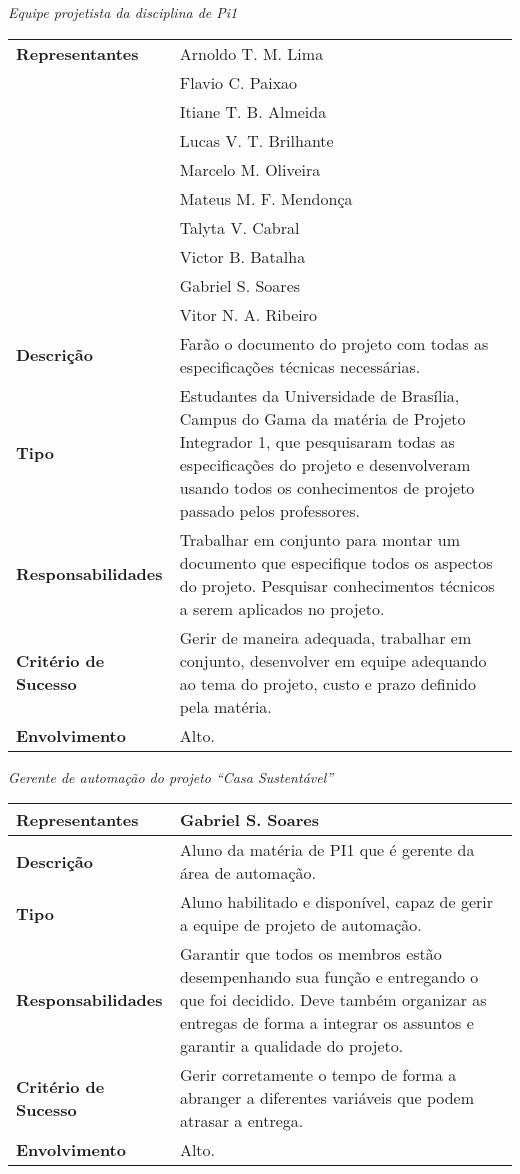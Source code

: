 \textit{Equipe projetista da disciplina de Pi1}

\begin{longtable}{|m{5cm}|m{10cm}|}
	\hline \textbf{Representantes} & Arnoldo T. M. Lima\\ & Flavio C. Paixao\\ & Itiane T. B. Almeida\\ & Lucas V. T.
	Brilhante\\ & Marcelo M. Oliveira\\ & Mateus M. F. Mendon\c{c}a\\ & Talyta V. Cabral\\ & Victor B. Batalha\\ &
	Gabriel S. Soares\\ & Vitor N. A. Ribeiro\\
	\hline \textbf{Descrição} & Farão o documento do projeto com todas as especificações técnicas necessárias.\\
	\hline \textbf{Tipo} & Estudantes da Universidade de Brasília, Campus do Gama da matéria de Projeto Integrador 1,
	que pesquisaram todas as especificações do projeto e desenvolveram usando todos os conhecimentos de projeto passado
	pelos professores.\\
	\hline \textbf{Responsabilidades} & Trabalhar em conjunto para montar um documento que especifique todos os aspectos
	 do projeto. Pesquisar conhecimentos técnicos a serem aplicados no projeto.\\
	\hline \textbf{Critério de Sucesso} & Gerir de maneira adequada, trabalhar em conjunto, desenvolver em equipe
	adequando ao tema do projeto, custo e prazo definido pela matéria.\\
	\hline \textbf{Envolvimento} & Alto.\\
	\hline
\end{longtable}

\textit{Gerente de automação do projeto “Casa Sustentável”}

\begin{longtable}{|m{5cm}|m{10cm}|}
	\hline \textbf{Representantes} & Gabriel S. Soares\\
	\hline \textbf{Descrição} & Aluno da matéria de PI1 que é gerente da área de automação.\\
	\hline \textbf{Tipo} & Aluno habilitado e disponível, capaz de gerir a equipe de projeto de automação.\\
	\hline \textbf{Responsabilidades} & Garantir que todos os membros estão desempenhando sua função e entregando o que
	 foi decidido. Deve também organizar as entregas de forma a integrar os assuntos e garantir a qualidade do projeto.\\
	\hline \textbf{Critério de Sucesso} & Gerir corretamente o tempo de forma a abranger a diferentes variáveis que
	podem atrasar a entrega.\\
	\hline \textbf{Envolvimento} & Alto.\\
	\hline
\end{longtable}

